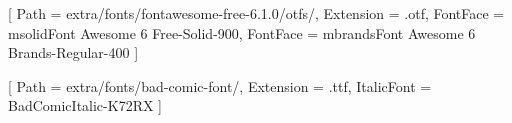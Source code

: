 \newcommand{\loadedFonts}{}



\newfontfamily{}[
    Path = {extra/fonts/fontawesome-free-6.1.0/otfs/}, Extension = {.otf},
    FontFace = {m}{solid}{Font Awesome 6 Free-Solid-900},
    FontFace = {m}{brands}{Font Awesome 6 Brands-Regular-400}
]

\newfontfamily{}[
    Path = {extra/fonts/bad-comic-font/}, Extension = {.ttf},
    ItalicFont = {BadComicItalic-K72RX}
]
